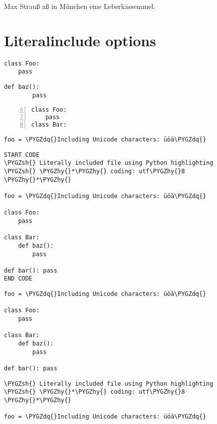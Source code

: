 \documentclass[letterpaper,10pt,english]{sphinxmanual}
\def\PYGZsh{\char`\#}
\def\PYGZhy{\char`\-}
\def\PYGZdq{\char`\"}
\begin{document}
Max Strauß aß in München eine Leberkässemmel.


\chapter{Literalinclude options}
\label{includes:literalinclude-options}
\begin{Verbatim}[commandchars=\\\{\}]
class Foo:
    pass
\end{Verbatim}

\begin{Verbatim}[commandchars=\\\{\}]
    def baz():
        pass
\end{Verbatim}

\begin{Verbatim}[commandchars=\\\{\},numbers=left,firstnumber=6,stepnumber=1]
class Foo:
    pass
class Bar:
\end{Verbatim}

\begin{Verbatim}[commandchars=\\\{\}]
foo = \PYGZdq{}Including Unicode characters: üöä\PYGZdq{}
\end{Verbatim}

\begin{Verbatim}[commandchars=\\\{\}]
START CODE
\PYGZsh{} Literally included file using Python highlighting
\PYGZsh{} \PYGZhy{}*\PYGZhy{} coding: utf\PYGZhy{}8 \PYGZhy{}*\PYGZhy{}

foo = \PYGZdq{}Including Unicode characters: üöä\PYGZdq{}

class Foo:
    pass

class Bar:
    def baz():
        pass

def bar(): pass
END CODE
\end{Verbatim}

\begin{Verbatim}[commandchars=\\\{\}]
foo = \PYGZdq{}Including Unicode characters: üöä\PYGZdq{}

class Foo:
    pass

class Bar:
    def baz():
        pass

def bar(): pass
\end{Verbatim}

\begin{Verbatim}[commandchars=\\\{\}]
\PYGZsh{} Literally included file using Python highlighting
\PYGZsh{} \PYGZhy{}*\PYGZhy{} coding: utf\PYGZhy{}8 \PYGZhy{}*\PYGZhy{}

foo = \PYGZdq{}Including Unicode characters: üöä\PYGZdq{}
\end{Verbatim}
\end{document}
